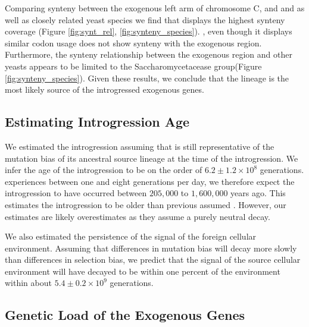 Comparing synteny between the exogenous left arm of chromosome C, and \gossypii and \dubl as well as closely related yeast species we find that \gossypii displays the highest synteny coverage  (Figure \ref{fig:synt_rel}, \ref{fig:synteny_species}).
\dubl, even though it displays similar codon usage does not show synteny with the exogenous region.
Furthermore, the synteny relationship between the exogenous region and other yeasts appears to be limited to the Saccharomycetacease group(Figure \ref{fig:synteny_species}).
Given these results, we conclude that the \gossypii lineage is the most likely source of the introgressed exogenous genes.

\subsection{Estimating Introgression Age}

We estimated the introgression assuming that \gossypii is still representative of the mutation bias of its ancestral source lineage at the time of the introgression.
We infer the age of the introgression to be on the order of $6.2\pm1.2\times 10^8$ generations. 
\kluyveri experiences between one and eight generations per day, we therefore expect the introgression to have occurred between $205,000$ to $1,600,000$ years ago.
This estimates the introgression to be older than previous assumed \citet{friedrich2015}.
However, our estimates are likely overestimates as they assume a purely neutral decay.

We also estimated the persistence of the signal of the foreign cellular environment.
Assuming that differences in mutation bias will decay more slowly than differences in selection bias, we predict that the \DM signal of the source cellular environment will have decayed to be within one percent of the \kluyveri environment within about $5.4\pm0.2\times 10^9 $ generations.

\subsection{Genetic Load of the Exogenous Genes}

